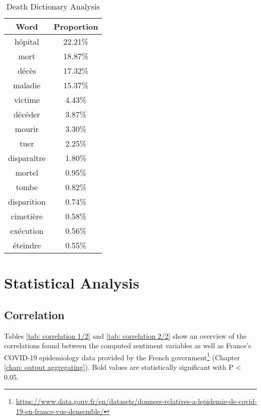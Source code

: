 \begin{table}[H]
\caption{Death Dictionary Analysis}
\label{tab:death freqs}
\centering
\begin{tabular}{@{}cc@{}}
\toprule
Word      & Proportion \\ \midrule
hôpital     & 22.21\% \\
mort        & 18.87\% \\
décès       & 17.32\% \\
maladie     & 15.37\% \\
victime     & 4.43\%  \\
décéder     & 3.87\%  \\
mourir      & 3.30\%  \\
tuer        & 2.25\%  \\
disparaître & 1.80\%  \\
mortel      & 0.95\%  \\
tombe       & 0.82\%  \\
disparition & 0.74\%  \\
cimetière   & 0.58\%  \\
exécution   & 0.56\%  \\
éteindre    & 0.55\%  \\ \bottomrule
\end{tabular}
\end{table}

\section{Statistical Analysis}

\subsection{Correlation}

Tables \ref{tab: correlation 1/2} and  \ref{tab: correlation 2/2} show an overview of the correlations found between the computed sentiment variables as well as France's COVID-19 epidemiology data provided by the French government\footnote{\url{https://www.data.gouv.fr/en/datasets/donnees-relatives-a-lepidemie-de-covid-19-en-france-vue-densemble/}} (Chapter \ref{chap: output aggregating}). Bold values are statistically significant with P < 0.05.

